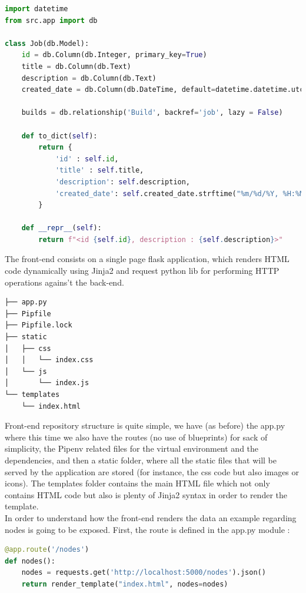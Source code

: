 \documentclass{article}
\begin{document}
\begin{lstlisting}[language=Python]
import datetime
from src.app import db

class Job(db.Model):
    id = db.Column(db.Integer, primary_key=True)
    title = db.Column(db.Text)
    description = db.Column(db.Text)
    created_date = db.Column(db.DateTime, default=datetime.datetime.utcnow)

    builds = db.relationship('Build', backref='job', lazy = False)

    def to_dict(self):
        return {
            'id' : self.id,
            'title' : self.title,
            'description': self.description,
            'created_date': self.created_date.strftime("%m/%d/%Y, %H:%M:%S")
        }

    def __repr__(self):
        return f"<id {self.id}, description : {self.description}>"
\end{lstlisting}

The front-end consists on a single page flask application, which renders HTML code dynamically using Jinja2 and request python lib for performing HTTP operations agains't the back-end.

\begin{lstlisting}[style=ascii-tree]
├── app.py
├── Pipfile
├── Pipfile.lock
├── static
│   ├── css
│   │   └── index.css
│   └── js
│       └── index.js
└── templates
    └── index.html
\end{lstlisting}

Front-end repository structure is quite simple, we have (as before) the app.py where this time we also have the routes (no use of blueprints) for sack of simplicity, the Pipenv related files for the virtual environment and the dependencies, and then a static folder, where all the static files that will be served by the application are stored (for instance, the css code but also images or icons). The templates folder contains the main HTML file which not only contains HTML code but also is plenty of Jinja2 syntax in order to render the template.
~\\

In order to understand how the front-end renders the data an example regarding nodes is going to be exposed. First, the route is defined in the app.py module :

\begin{lstlisting}[language=Python]
@app.route('/nodes')
def nodes():
    nodes = requests.get('http://localhost:5000/nodes').json()
    return render_template("index.html", nodes=nodes)
\end{lstlisting}
\end{document}
